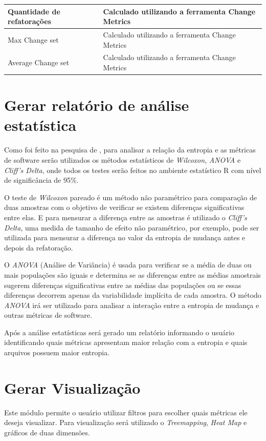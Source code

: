 \begin{table}[H]
\begin{tabular}{|p{3cm}|p{12cm}|}
Quantidade de refatorações          & Calculado utilizando a ferramenta Change Metrics                                            \\ \hline
Max Change set                      & Calculado utilizando a ferramenta Change Metrics                                            \\ \hline
Average Change set                  & Calculado utilizando a ferramenta Change Metrics                                            \\ \hline
\end{tabular}
\end{table}

\section{Gerar relatório de análise estatística}
Como foi feito na pesquisa de , para analisar a relação da entropia e as métricas de software serão utilizados os métodos estatísticos de \textit{Wilcoxon}, \textit{ANOVA} e \textit{Cliff's Delta}, onde todos os testes serão feitos no ambiente estatístico R com nível de significância de 95\%.

O teste de \textit{Wilcoxon} pareado é um método não paramétrico para comparação de duas amostras com o objetivo de verificar se existem diferenças significativas entre elas. E para mensurar a diferença entre as amostras é utilizado o \textit{Cliff's Delta}, uma medida de tamanho de efeito não paramétrico, por exemplo, pode ser utilizada para mensurar a diferença no valor da entropia de mudança antes e depois da refatoração.

O \textit{ANOVA} (Análise de Variância) é usada para verificar se a média de duas ou mais populações são iguais e determina se as diferenças entre as médias amostrais sugerem diferenças significativas entre as médias das populações ou se essas diferenças decorrem apenas da variabilidade implícita de cada amostra. O método \textit{ANOVA} irá ser utilizado para analisar a interação entre a entropia de mudança e outras métricas de software. 

Após a análise estatísticas será gerado um relatório informando o usuário identificando quais métricas apresentam maior relação com a entropia e quais arquivos possuem maior entropia.

\section{Gerar Visualização}
Este módulo permite o usuário utilizar filtros para escolher quais métricas ele deseja visualizar. Para visualização será utilizado o \textit{Treemapping}, \textit{Heat Map} e gráficos de duas dimensões.

